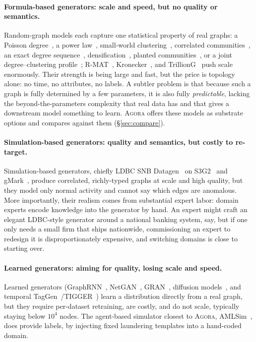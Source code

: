 \documentclass[sigconf,review,anonymous]{acmart}
\newcommand{\sys}{\textsc{Agora}\xspace}
\begin{document}
\paragraph{Formula-based generators: scale and speed, but no quality or semantics.}
Random-graph models each capture one statistical property of real graphs: a Poisson
degree~\cite{erdos1960evolution}, a power law~\cite{barabasi1999emergence,
price1976cumulative}, small-world clustering~\cite{watts1998smallworld}, correlated
communities~\cite{kumar2000copying,vazquez2003duplication}, an exact degree
sequence~\cite{molloy1995configuration,newman2001arbitrary},
densification~\cite{leskovec2005forestfire,leskovec2007graphevolution}, planted
communities~\cite{holland1983sbm,karrer2011dcsbm,lancichinetti2008lfr}, or a joint
degree--clustering profile~\cite{penrose2003rgg,kolda2014bter};
R-MAT~\cite{chakrabarti2004rmat}, Kronecker~\cite{leskovec2010kronecker}, and
TrillionG~\cite{park2017trilliong} push scale enormously. Their strength is being large
and fast, but the price is topology alone: no time, no attributes, no labels. A subtler
problem is that because such a graph is fully determined by a few parameters, it is
also fully \emph{predictable}, lacking the beyond-the-parameters complexity that real
data has and that gives a downstream model something to learn. \sys{} offers these
models as substrate options and compares against them (\S\ref{sec:compare}).

\paragraph{Simulation-based generators: quality and semantics, but costly to re-target.}
Simulation-based generators, chiefly LDBC SNB Datagen~\cite{erling2015ldbc} on
S3G2~\cite{pham2012s3g2} and gMark~\cite{bagan2017gmark}, produce correlated,
richly-typed graphs at scale and high quality, but they model only normal activity and
cannot say which edges are anomalous. More importantly, their realism comes from
substantial expert labor: domain experts encode knowledge into the generator by hand.
An expert might craft an elegant LDBC-style generator around a national banking system,
say, but if one only needs a small firm that ships nationwide, commissioning an expert
to redesign it is disproportionately expensive, and switching domains is close to
starting over.

\paragraph{Learned generators: aiming for quality, losing scale and speed.}
Learned generators (GraphRNN~\cite{you2018graphrnn}, NetGAN~\cite{bojchevski2018netgan},
GRAN~\cite{liao2019gran}, diffusion models~\cite{vignac2023digress}, and temporal
TagGen~\cite{zhou2020taggen}/TIGGER~\cite{gupta2022tigger}) learn a distribution
directly from a real graph, but they require per-dataset retraining, are costly, and do
not scale, typically staying below $10^4$ nodes. The agent-based simulator closest to
\sys, AMLSim~\cite{suzumura2021amlsim}, does provide labels, by injecting fixed
laundering templates into a hand-coded domain.
\end{document}
